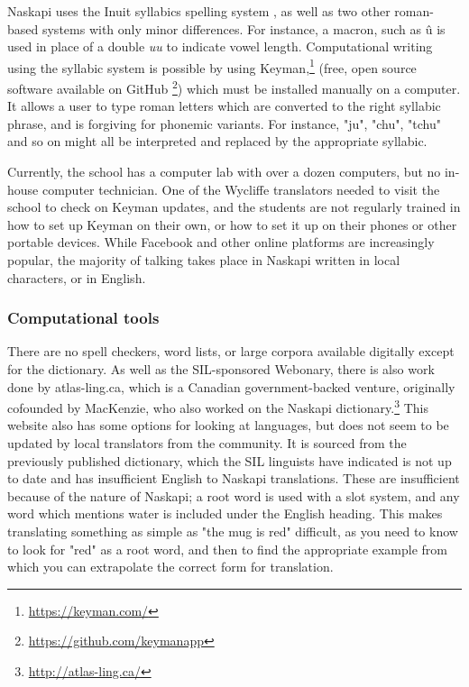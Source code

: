 Naskapi uses the Inuit syllabics spelling system \cite{wals-141},
as well as two other roman-based systems with only minor differences. For instance, a macron, such as \^u is used in place of a double \emph{uu} to indicate vowel length. Computational writing using the syllabic system is possible by using Keyman,\footnote{\href{https://keyman.com/}{https://keyman.com/}} (free, open source software available on GitHub \footnote{\href{https://github.com/keymanapp}{https://github.com/keymanapp}})
which must be installed manually on a computer. It allows a user to type roman letters which are converted to the right syllabic phrase, and is forgiving for phonemic variants. For instance, "ju", "chu", "tchu" and so on might all be interpreted and replaced by the appropriate syllabic. %

Currently, the school has a computer lab with over a dozen computers, but no in-house computer technician. One of the Wycliffe translators needed to visit the school to check on Keyman updates, and the students are not regularly trained in how to set up Keyman on their own, or how to set it up on their phones or other portable devices. While Facebook and other online platforms are increasingly popular, the majority of talking takes place in Naskapi written in local characters, or in English.

\subsubsection{Computational tools}
There are no spell checkers, word lists, or large corpora available digitally except for the dictionary. As well as the SIL-sponsored Webonary, there is also work done by atlas-ling.ca, which is a Canadian government-backed venture, originally cofounded by MacKenzie, who also worked on the Naskapi dictionary.\footnote{\href{http://atlas-ling.ca/}{http://atlas-ling.ca/}}
This website also has some options for looking at languages, but does not seem to be updated by local translators from the community. It is sourced from the previously published dictionary, which the SIL linguists have indicated is not up to date and has insufficient English to Naskapi translations. These are insufficient because of the nature of Naskapi; a root word is used with a slot system, and any word which mentions water is included under the English heading. This makes translating something as simple as "the mug is red" difficult, as you need to know to look for "red" as a root word, and then to find the appropriate example from which you can extrapolate the correct form for translation.

